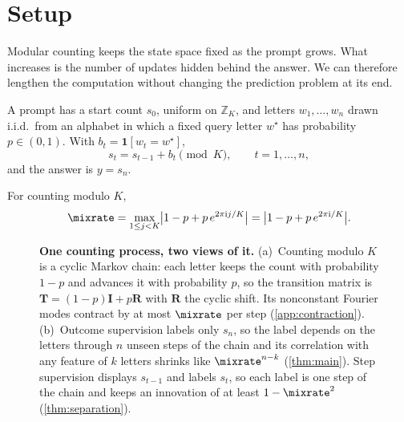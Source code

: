 \section{Setup}
\label{sec:setup}
\label{sec:setting}

Modular counting keeps the state space fixed as the prompt grows. What increases is the number of updates hidden behind the
answer. We can therefore lengthen the computation without changing the prediction problem at its end.

\begin{definition}
\label{def:task}
A prompt has a start count $s_0$, uniform on $\mathbb Z_K$, and letters $w_1,\ldots,w_n$ drawn i.i.d.\ from an alphabet
in which a fixed query letter $w^\star$ has probability $p\in(0,1)$. With $b_t=\mathbf 1[w_t=w^\star]$,
\begin{equation}
 s_t=s_{t-1}+b_t\pmod K,\qquad t=1,\ldots,n,
 \label{eq:tracking}
\end{equation}
and the answer is $y=s_n$.
\end{definition}

\begin{definition}
\label{def:lambda}
For counting modulo $K$,
\begin{equation}
 \mixrate=\max_{1\le j<K}\bigl|1-p+p\,e^{2\pi\mathrm ij/K}\bigr|=\bigl|1-p+p\,e^{2\pi\mathrm i/K}\bigr|.
 \label{eq:lambda}
\end{equation}
\end{definition}

\begin{figure}[t]
\centering
\resizebox{\linewidth}{!}{}
\caption{\textbf{One counting process, two views of it.}
(a)~Counting modulo $K$ is a cyclic Markov chain: each letter keeps the count with probability $1-p$ and advances it with probability
$p$, so the transition matrix is $\mathbf T=(1-p)\mathbf I+p\mathbf R$ with $\mathbf R$ the cyclic shift. Its nonconstant Fourier modes
contract by at most $\mixrate$ per step (\cref{app:contraction}).
(b)~Outcome supervision labels only $s_n$, so the label depends on the letters through $n$ unseen steps of the chain and its
correlation with any feature of $k$ letters shrinks like $\mixrate^{n-k}$ (\cref{thm:main}). Step supervision displays $s_{t-1}$ and labels $s_t$, so each label is one
step of the chain and keeps an innovation of at least $1-\mixrate^2$ (\cref{thm:separation}).}
\label{fig:chain}
\end{figure}

